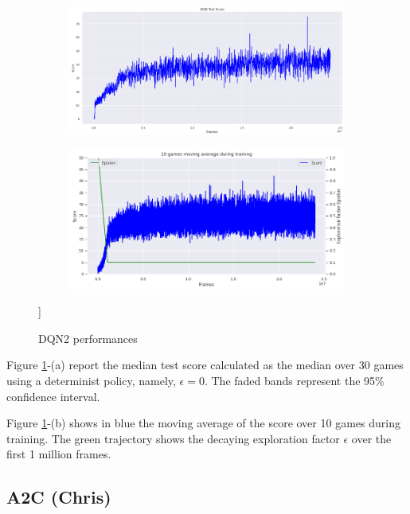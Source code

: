 \documentclass{article}
\begin{document}
\begin{figure}[H]
\centering
\begin{subfigure}{0.49\textwidth}
\centering
\includegraphics[scale=0.46]{DQNTestScore.PNG}
\end{subfigure}
\begin{subfigure}{0.49\textwidth}
\centering
\includegraphics[scale=0.46]{DQNMovAvgTraining.PNG}
\end{subfigure}
\caption[width=0.7\textwidth]{DQN2 performances}]
\label{fig:DQN2}
\end{figure}

Figure \ref{fig:DQN2}-(a) report the median test score calculated as the median over 30 games using a determinist policy, namely, $\epsilon = 0$. The faded bands represent the 95\% confidence interval.

Figure \ref{fig:DQN2}-(b) shows in blue the moving average of the score over 10 games during training. The green trajectory shows the decaying exploration factor $\epsilon$ over the first 1 million frames. 


\subsection{A2C (Chris)}
\end{document}
